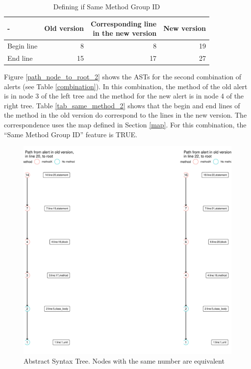\documentclass[
]{article}
\begin{document}
\normalsize

\small

\begin{table}[H]

\caption{\label{tab:unnamed-chunk-9}Defining if Same Method Group ID \label{tab_same_method}}
\centering
\begin{tabular}[t]{l|r|r|r}
\hline
- & Old version & \makecell[l]{Corresponding line\\in the new version} & New version\\
\hline
Begin line & 8 & 8 & 19\\
\hline
End line & 15 & 17 & 27\\
\hline
\end{tabular}
\end{table}

\normalsize

Figure \ref{path_node_to_root_2} shows the ASTs for the second
combination of alerts (see Table \ref{combination}). In this combination,
the method of the old alert is in node 3 of the left tree and the method
for the new alert is in node 4 of the right tree. Table
\ref{tab_same_method_2} shows that the begin and end lines of the method
in the old version do correspond to the lines in the new version. The
correspondence uses the map defined in Section \ref{map}. For this
combination, the ``Same Method Group ID'' feature is TRUE.


\small

\begin{figure}[H]
\includegraphics[width=1\linewidth]{report_files/figure-latex/unnamed-chunk-10-1} \caption{Abstract Syntax Tree. Nodes with the same number are equivalent \label{path_node_to_root_2}}\label{fig:unnamed-chunk-10}
\end{figure}
\end{document}
